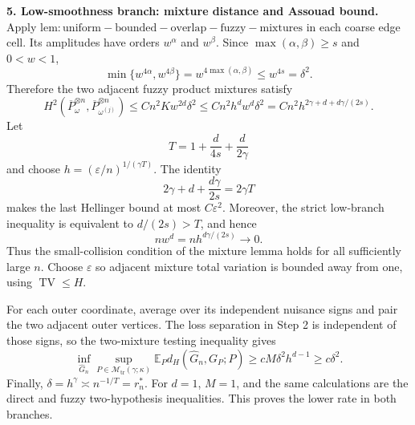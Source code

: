 \textbf{5. Low-smoothness branch: mixture distance and Assouad bound.} Apply \(\mathrm{lem:uniform-bounded-overlap-fuzzy-mixtures}\) in each coarse edge cell. Its amplitudes have orders \(w^\alpha\) and \(w^\beta\). Since \(\max(\alpha,\beta)\ge s\) and \(0<w<1\),
\[
\min\{w^{4\alpha},w^{4\beta}\}
=w^{4\max(\alpha,\beta)}\le w^{4s}=\delta^2.
\]
Therefore the two adjacent fuzzy product mixtures satisfy
\[
H^2(\overline P_\omega^{\otimes n},\overline P_{\omega^{(j)}}^{\otimes n})
\le Cn^2Kw^{2d}\delta^2
\le Cn^2h^dw^d\delta^2
=Cn^2h^{2\gamma+d+d\gamma/(2s)}.
\]
Let
\[
T=1+\frac{d}{4s}+\frac{d}{2\gamma}
\]
and choose \(h=(\varepsilon/n)^{1/(\gamma T)}\). The identity
\[
2\gamma+d+\frac{d\gamma}{2s}=2\gamma T
\]
makes the last Hellinger bound at most \(C\varepsilon^2\). Moreover, the strict low-branch inequality is equivalent to \(d/(2s)>T\), and hence
\[
nw^d=nh^{d\gamma/(2s)}\longrightarrow0.
\]
Thus the small-collision condition of the mixture lemma holds for all sufficiently large \(n\). Choose \(\varepsilon\) so adjacent mixture total variation is bounded away from one, using \(\operatorname{TV}\le H\).

For each outer coordinate, average over its independent nuisance signs and pair the two adjacent outer vertices. The loss separation in Step 2 is independent of those signs, so the two-mixture testing inequality gives
\[
\inf_{\widehat G_n}\sup_{P\in\mathcal M_{\mathrm{tr}}(\gamma;\kappa)}
\mathbb E_P d_H(\widehat G_n,G_P;P)
\ge cM\delta^2h^{d-1}\ge c\delta^2.
\]
Finally, \(\delta=h^\gamma\asymp n^{-1/T}=r_n^*\). For \(d=1\), \(M=1\), and the same calculations are the direct and fuzzy two-hypothesis inequalities. This proves the lower rate in both branches.